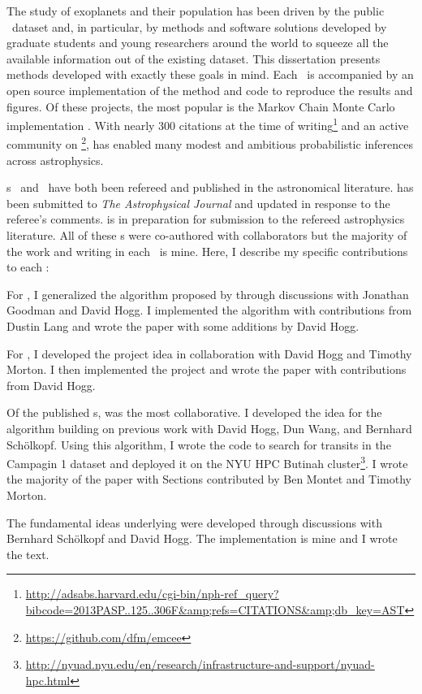 The study of exoplanets and their population has been driven by the public
\kepler\ dataset and, in particular, by methods and software solutions
developed by graduate students and young researchers around the world to
squeeze all the available information out of the existing dataset.
This dissertation presents methods developed with exactly these goals in mind.
Each \chapname\ is accompanied by an open source implementation of the method
and code to reproduce the results and figures.
Of these projects, the most popular is the Markov Chain Monte Carlo
implementation  \citep[][and
]{Foreman-Mackey:2013}.
With nearly 300 citations at the time of
writing\footnote{\url{http://adsabs.harvard.edu/cgi-bin/nph-ref_query?bibcode=2013PASP..125..306F&amp;refs=CITATIONS&amp;db_key=AST}}
and an active community on
\footnote{\url{https://github.com/dfm/emcee}}, 
has enabled many modest and ambitious probabilistic inferences across
astrophysics.

\chapname s~ and~ have both been refereed and
published in the astronomical literature.
 has been submitted to \emph{The Astrophysical Journal} and updated
in response to the referee's comments.
 is in preparation for submission to the refereed astrophysics
literature.
All of these \chapname s were co-authored with collaborators but the majority
of the work and writing in each \chapname\ is mine.
Here, I describe my specific contributions to each \chapname:
\begin{enumerate}

{\item For , I generalized the algorithm proposed by
\citet{Goodman:2010} through discussions with Jonathan Goodman and David Hogg.
I implemented the algorithm with contributions from Dustin Lang and wrote the
paper with some additions by David Hogg.}

{\item For , I developed the project idea in collaboration with
David Hogg and Timothy Morton.
I then implemented the project and wrote the paper with contributions from
David Hogg.}

{\item Of the published \chapname s,  was the most collaborative.
I developed the idea for the algorithm building on previous work with David
Hogg, Dun Wang, and Bernhard Sch\"olkopf.
Using this algorithm, I wrote the code to search for transits in the
 Campagin 1 dataset and deployed it on the NYU HPC Butinah
cluster\footnote{\url{http://nyuad.nyu.edu/en/research/infrastructure-and-support/nyuad-hpc.html}}.
I wrote the majority of the paper with Sections contributed by Ben Montet and
Timothy Morton.}

{\item The fundamental ideas underlying  were developed through
discussions with Bernhard Sch\"olkopf and David Hogg.
The implementation is mine and I wrote the text.}

\end{enumerate}
